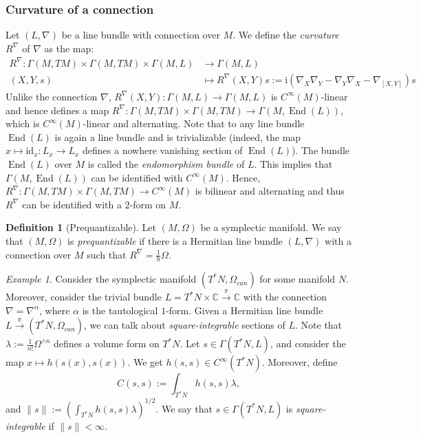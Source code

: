 \documentclass[11pt]{amsart}
\numberwithin{equation}{section}
\theoremstyle{plain}
\theoremstyle{definition}
\newtheorem{defn}{Definition}[subsection]
\theoremstyle{remark}
\newtheorem{ex}{Example}[subsection]
\newcommand{\id}{\mathrm{id}}
\DeclareMathOperator{\End}{End}
\newcommand{\I}{\mathrm{i}}
\begin{document}
\subsubsection{Curvature of a connection}
Let $(L,\nabla)$ be a line bundle with connection over $M$. We define the \emph{curvature} $R^\nabla$ of $\nabla$ as the map:
\begin{align*} 
R^\nabla\colon \Gamma(M,TM)\times\Gamma(M,TM)\times \Gamma(M,L)&\to \Gamma(M,L)\\
(X,Y,s)&\mapsto R^\nabla(X,Y)s:=\I\left(\nabla_X\nabla_Y-\nabla_Y\nabla_X-\nabla_{[X,Y]}\right)s
\end{align*}
Unlike the connection $\nabla$, $R^\nabla(X,Y)\colon \Gamma(M,L)\to \Gamma(M,L)$ is $C^\infty(M)$-linear and hence defines a map $R^\nabla\colon \Gamma(M,TM)\times\Gamma(M,TM)\to \Gamma(M,\End(L))$, which is $C^\infty(M)$-linear and alternating. Note that to any line bundle $\End(L)$ is again a line bundle and is trivializable (indeed, the map $x\mapsto \id_x\colon L_x\to L_x$ defines a nowhere vanishing section of $\End(L)$). The bundle $\End(L)$ over $M$ is called the \emph{endomorphism bundle} of $L$. This implies that $\Gamma(M,\End(L))$ can be identified with $C^\infty(M)$. Hence, $R^\nabla\colon \Gamma(M,TM)\times \Gamma(M,TM)\to C^\infty(M)$ is bilinear and alternating and thus $R^\nabla$ can be identified with a $2$-form on $M$.

\begin{defn}[Prequantizable]
Let $(M,\Omega)$ be a symplectic manifold. We say that $(M,\Omega)$ is \emph{prequantizable} if there is a Hermitian line bundle $(L,\nabla)$ with a connection over $M$ such that $R^\nabla=\frac{1}{\hbar}\Omega$.
\end{defn}

\begin{ex}
Consider the symplectic manifold $(T^*N,\Omega_{can})$ for some manifold $N$. Moreover, consider the trivial bundle $L=T^*N\times\mathbb{C}\xrightarrow{\pi}\mathbb{C}$ with the connection $\nabla=\nabla^\alpha$, where $\alpha$ is the tautological $1$-form. Given a Hermitian line bundle $L\xrightarrow{\pi}(T^*N,\Omega_{can})$, we can talk about \emph{square-integrable} sections of $L$. Note that $\lambda:=\frac{1}{n!}\Omega^{\land n}$ defines a volume form on $T^*N$. Let $s\in \Gamma(T^*N,L)$, and consider the map $x\mapsto h(s(x),s(x))$. We get $h(s,s)\in C^\infty(T^*N)$. Moreover, define 
\begin{equation}
\label{inner_prod}
C(s,s):=\int_{T^*N}h(s,s)\lambda,
\end{equation}
and $\|s\|:=\left(\int_{T^*N}h(s,s)\lambda\right)^{1/2}$. We say that $s\in\Gamma(T^*N,L)$ is \emph{square-integrable} if $\|s\|<\infty$. 
\end{ex}
\end{document}
